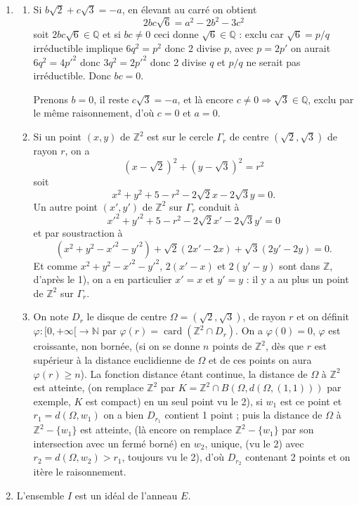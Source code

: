 \begin{enumerate}[label=\arabic*.,leftmargin=2.2em,itemsep=1.15em]
\item
\begin{enumerate}[label=\arabic*),leftmargin=2em]
\item Si $b\sqrt2+c\sqrt3=-a$, en élevant au carré on obtient
\[
2bc\sqrt6=a^2-2b^2-3c^2
\]
soit $2bc\sqrt6\in\mathbb Q$ et si $bc\ne0$ ceci donne $\sqrt6\in\mathbb Q$ : exclu car $\sqrt6=p/q$ irréductible implique $6q^2=p^2$ donc 2 divise $p$, avec $p=2p'$ on aurait $6q^2=4p'^2$ donc $3q^2=2p'^2$ donc 2 divise $q$ et $p/q$ ne serait pas irréductible. Donc $bc=0$.

Prenons $b=0$, il reste $c\sqrt3=-a$, et là encore $c\ne0\Rightarrow\sqrt3\in\mathbb Q$, exclu par le même raisonnement, d'où $c=0$ et $a=0$.

\item Si un point $(x,y)$ de $\mathbb Z^2$ est sur le cercle $\Gamma_r$ de centre $(\sqrt2,\sqrt3)$ de rayon $r$, on a
\[
(x-\sqrt2)^2+(y-\sqrt3)^2=r^2
\]
soit
\[
x^2+y^2+5-r^2-2\sqrt2x-2\sqrt3y=0.
\]
Un autre point $(x',y')$ de $\mathbb Z^2$ sur $\Gamma_r$ conduit à
\[
x'^2+y'^2+5-r^2-2\sqrt2x'-2\sqrt3y'=0
\]
et par soustraction à
\[
(x^2+y^2-x'^2-y'^2)+\sqrt2(2x'-2x)+\sqrt3(2y'-2y)=0.
\]
Et comme $x^2+y^2-x'^2-y'^2$, $2(x'-x)$ et $2(y'-y)$ sont dans $\mathbb Z$, d'après le 1), on a en particulier $x'=x$ et $y'=y$ : il y a au plus un point de $\mathbb Z^2$ sur $\Gamma_r$.

\item On note $D_r$ le disque de centre $\Omega=(\sqrt2,\sqrt3)$, de rayon $r$ et on définit $\varphi:[0,+\infty[\longrightarrow\mathbb N$ par $\varphi(r)=\operatorname{card}(\mathbb Z^2\cap D_r)$. On a $\varphi(0)=0$, $\varphi$ est croissante, non bornée, (si on se donne $n$ points de $\mathbb Z^2$, dès que $r$ est supérieur à la distance euclidienne de $\Omega$ et de ces points on aura $\varphi(r)\ge n$). La fonction distance étant continue, la distance de $\Omega$ à $\mathbb Z^2$ est atteinte, (on remplace $\mathbb Z^2$ par $K=\mathbb Z^2\cap B(\Omega,d(\Omega,(1,1)))$ par exemple, $K$ est compact) en un seul point vu le 2), si $w_1$ est ce point et $r_1=d(\Omega,w_1)$ on a bien $D_{r_1}$ contient 1 point ; puis la distance de $\Omega$ à $\mathbb Z^2-\{w_1\}$ est atteinte, (là encore on remplace $\mathbb Z^2-\{w_1\}$ par son intersection avec un fermé borné) en $w_2$, unique, (vu le 2) avec $r_2=d(\Omega,w_2)>r_1$, toujours vu le 2), d'où $D_{r_2}$ contenant 2 points et on itère le raisonnement.
\end{enumerate}

\item L'ensemble $I$ est un idéal de l'anneau $E$.


\end{enumerate}
